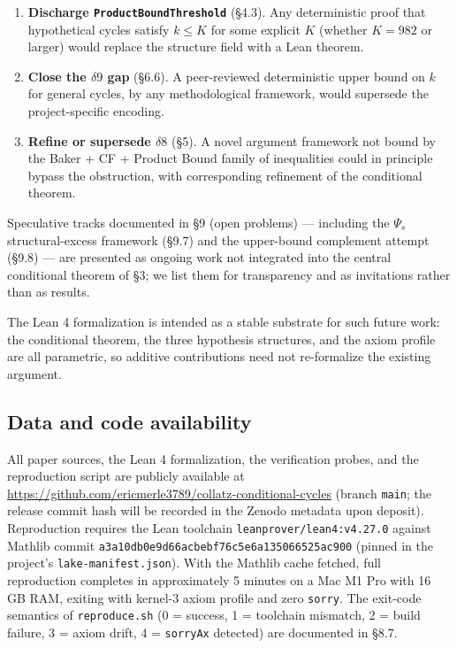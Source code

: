 \documentclass[
  11pt]{amsart}
\theoremstyle{plain}
\theoremstyle{definition}
\theoremstyle{remark}
\begin{document}
\begin{enumerate}
\def\labelenumi{\arabic{enumi}.}
\item
  \textbf{Discharge \texttt{ProductBoundThreshold}} (§4.3). Any
  deterministic proof that hypothetical cycles satisfy \(k \leq K\) for
  some explicit \(K\) (whether \(K = 982\) or larger) would replace the
  structure field with a Lean theorem.
\item
  \textbf{Close the \(\delta 9\) gap} (§6.6). A peer-reviewed
  deterministic upper bound on \(k\) for general cycles, by any
  methodological framework, would supersede the project-specific
  encoding.
\item
  \textbf{Refine or supersede \(\delta 8\)} (§5). A novel argument
  framework not bound by the Baker + CF + Product Bound family of
  inequalities could in principle bypass the obstruction, with
  corresponding refinement of the conditional theorem.
\end{enumerate}

Speculative tracks documented in §9 (open problems) --- including the
\(\Psi_s\) structural-excess framework (§9.7) and the upper-bound
complement attempt (§9.8) --- are presented as ongoing work not
integrated into the central conditional theorem of §3; we list them for
transparency and as invitations rather than as results.

The Lean 4 formalization is intended as a stable substrate for such
future work: the conditional theorem, the three hypothesis structures,
and the axiom profile are all parametric, so additive contributions need
not re-formalize the existing argument.

\subsection*{Data and code
availability}\label{data-and-code-availability}

All paper sources, the Lean 4 formalization, the verification probes,
and the reproduction script are publicly available at
\url{https://github.com/ericmerle3789/collatz-conditional-cycles}
(branch \texttt{main}; the release commit hash will be recorded in the
Zenodo metadata upon deposit). Reproduction requires the Lean toolchain
\texttt{leanprover/lean4:v4.27.0} against Mathlib commit
\texttt{a3a10db0e9d66acbebf76c5e6a135066525ac900} (pinned in the
project's \texttt{lake-manifest.json}). With the Mathlib cache fetched,
full reproduction completes in approximately 5 minutes on a Mac M1 Pro
with 16 GB RAM, exiting with kernel-3 axiom profile and zero
\texttt{sorry}. The exit-code semantics of \texttt{reproduce.sh} (0 =
success, 1 = toolchain mismatch, 2 = build failure, 3 = axiom drift, 4 =
\texttt{sorryAx} detected) are documented in §8.7.
\end{document}
